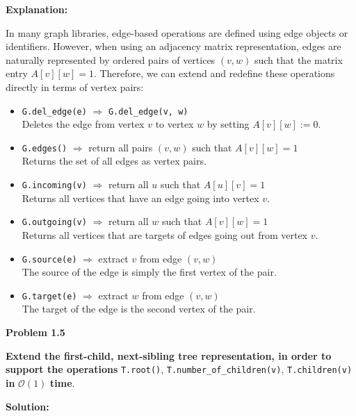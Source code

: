 \documentclass{article}
\begin{document}
\textbf{Explanation:}

In many graph libraries, edge-based operations are defined using edge objects or identifiers. However, when using an adjacency matrix representation, edges are naturally represented by ordered pairs of vertices \((v, w)\) such that the matrix entry \(A[v][w] = 1\). Therefore, we can extend and redefine these operations directly in terms of vertex pairs:

\begin{itemize}
    \item \texttt{G.del\_edge(e)} $\Rightarrow$ \texttt{G.del\_edge(v, w)} \\
    Deletes the edge from vertex \(v\) to vertex \(w\) by setting \(A[v][w] := 0\).

    \item \texttt{G.edges()} $\Rightarrow$ return all pairs \((v, w)\) such that \(A[v][w] = 1\) \\
    Returns the set of all edges as vertex pairs.

    \item \texttt{G.incoming(v)} $\Rightarrow$ return all \(u\) such that \(A[u][v] = 1\) \\
    Returns all vertices that have an edge going into vertex \(v\).

    \item \texttt{G.outgoing(v)} $\Rightarrow$ return all \(w\) such that \(A[v][w] = 1\) \\
    Returns all vertices that are targets of edges going out from vertex \(v\).

    \item \texttt{G.source(e)} $\Rightarrow$ extract \(v\) from edge \((v, w)\) \\
    The source of the edge is simply the first vertex of the pair.

    \item \texttt{G.target(e)} $\Rightarrow$ extract \(w\) from edge \((v, w)\) \\
    The target of the edge is the second vertex of the pair.
\end{itemize}

\textbf{Problem 1.5}

\textbf{Extend the first-child, next-sibling tree representation, in order to support the operations} \texttt{T.root()}, \texttt{T.number\_of\_children(v)}, \texttt{T.children(v)} \textbf{in} $\mathcal{O}(1)$ \textbf{time}.

\textbf{Solution:}
\end{document}
